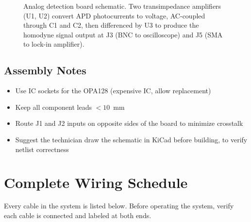 \documentclass[11pt,a4paper,openany]{book}
\begin{document}
\begin{figure}[H]
\caption{Analog detection board schematic. Two transimpedance amplifiers (U1, U2) convert APD photocurrents to voltage, AC-coupled through C1 and C2, then differenced by U3 to produce the homodyne signal output at J3 (BNC to oscilloscope) and J5 (SMA to lock-in amplifier).}
\label{fig:analog-schematic}
\end{figure}

\section{Assembly Notes}

\begin{itemize}[nosep]
  \item Use IC sockets for the OPA128 (expensive IC, allow replacement)
  \item Keep all component leads $< 10$~mm
  \item Route J1 and J2 inputs on opposite sides of the board to minimize crosstalk
  \item Suggest the technician draw the schematic in KiCad before building, to verify netlist correctness
\end{itemize}


\chapter{Complete Wiring Schedule}\label{ch:wiring}

Every cable in the system is listed below. Before operating the system, verify each cable is connected and labeled at both ends.
\end{document}

